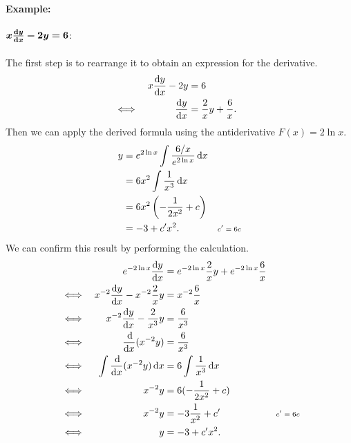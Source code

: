 \documentclass[MathsNotesBase.tex]{subfiles}
\begin{document}
{		\paragraph{Example:}
		\begin{exe}
			\item{${\bm{ x\frac{\dif y}{\dif x} - 2y = 6 }}$:\\\\
				The first step is to rearrange it to obtain an expression for the derivative. 
				\begin{align*}
				&& x\frac{\dif y}{\dif x} - 2y &= 6 \\
				&\iff & \frac{\dif y}{\dif x} &= \frac{2}{x}y + \frac{6}{x}. &\sidecomment{} \\
				\end{align*}
				Then we can apply the derived formula using the antiderivative ${ F(x) = 2\ln{x} }$.
				\begin{align*}
				y &= e^{2\ln{x}}\int \frac{6/x}{e^{2\ln{x}}} \dif x \\
				&= 6x^2 \int \frac{1}{x^3} \dif x &\sidecomment{} \\
				&= 6x^2\left(-\frac{1}{2x^2} + c\right) &\sidecomment{} \\
				&= -3 + c'x^2. &\sidecomment{${ c' = 6c }$} \\
				\end{align*}
				We can confirm this result by performing the calculation.
				\begin{align*}
				&& e^{-2\ln{x}}\frac{\dif y}{\dif x} &= e^{-2\ln{x}}\frac{2}{x}y + e^{-2\ln{x}}\frac{6}{x} \\
				&\iff & x^{-2}\frac{\dif y}{\dif x} - x^{-2}\frac{2}{x}y &= x^{-2}\frac{6}{x} &\sidecomment{} \\
				&\iff & x^{-2}\frac{\dif y}{\dif x} - \frac{2}{x^3}y &= \frac{6}{x^3} &\sidecomment{} \\
				&\iff & \frac{\dif }{\dif x}(x^{-2}y) &= \frac{6}{x^3} &\sidecomment{} \\
				&\iff & \int \frac{\dif }{\dif x}(x^{-2}y) \dif x &= 6 \int \frac{1}{x^3} \dif x &\sidecomment{} \\
				&\iff & x^{-2}y &= 6(-\frac{1}{2x^2} + c) &\sidecomment{} \\
				&\iff & x^{-2}y &= -3\frac{1}{x^2} + c' &\sidecomment{${ c' = 6c }$} \\
				&\iff & y &= -3 + c'x^2. &\sidecomment{} \\
				\end{align*}
			}
		\end{exe}
	
}
\end{document}
